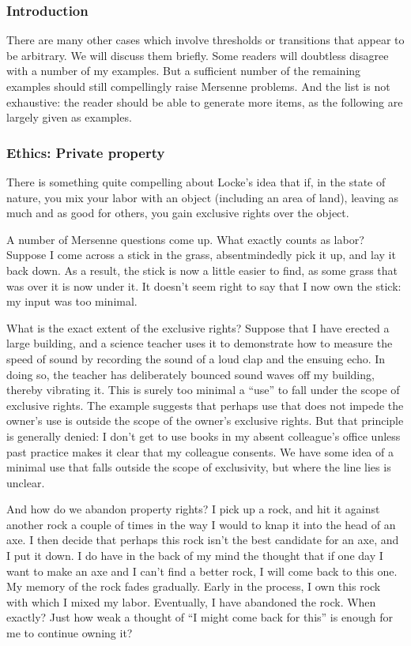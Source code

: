 \subsubsection{Introduction}
There are many other cases which involve thresholds or transitions that appear to be arbitrary. We will discuss them briefly.
Some readers will doubtless disagree with a number of my examples. But a sufficient number of the remaining examples 
should still compellingly raise Mersenne problems. And the list is not
exhaustive: the reader should be able to generate more items, as the following are largely given as examples.

\subsubsection{Ethics: Private property}
There is something quite compelling about Locke's idea that if, in the state of nature, you mix your labor with 
an object (including an area of land), leaving as much and as good for others, you gain exclusive rights over 
the object. 

A number of Mersenne questions come up. What exactly counts as labor? Suppose I come across a stick in 
the grass, absentmindedly pick it up, and lay it back down. As a result, the stick is now a little easier to find, as 
some grass that was over it is now under it.  It doesn't seem right to say that I now own
the stick: my input was too minimal. 

What is the exact extent of the exclusive rights? Suppose that I have erected a large 
building, and a science teacher uses it to demonstrate how to measure the speed of sound by recording the sound of a loud 
clap and the ensuing echo. In doing so, the teacher has deliberately bounced sound waves off my building, thereby vibrating 
it. This is surely too minimal a ``use'' to fall under the scope of exclusive rights. The example suggests that perhaps use that 
does not impede the owner's use is outside the scope of the owner's exclusive rights. But that principle is generally 
denied: I don't get to use books in my absent colleague's office unless past practice makes it clear that my 
colleague consents. We have some idea of a minimal use that falls outside the scope of exclusivity, but where the 
line lies is unclear.

And how do we abandon property rights? I pick up a rock, and hit it against another rock a couple of times in the way
I would to knap it into the head of an axe. I then decide that perhaps this rock isn't the best candidate for an axe, and I
put it down. I do have in the back of my mind the thought that if one day I want to make an axe and I can't find a better 
rock, I will come back to this one. My memory of the rock fades gradually. Early in the process, I own this 
rock with which I mixed my labor. Eventually, I have abandoned the rock. When exactly? Just how weak a thought of ``I might 
come back for this'' is enough for me to continue owning it? 

